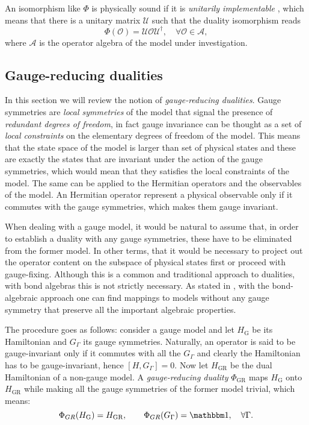 An isomorphism like $\Phi$ is physically sound if it is \emph{unitarily implementable} \cite{cobanera2011bond}, which means that there is a unitary matrix $\mathcal{U}$ such that the duality isomorphism reads
\begin{equation}
    \Phi(\mathcal{O}) =
    \mathcal{U} \mathcal{O} \mathcal{U}^{\dagger}, \quad
    \forall \mathcal{O} \in \mathcal{A},
\end{equation}
where $\mathcal{A}$ is the operator algebra of the model under investigation.

%
%
\subsection{Gauge-reducing dualities}%
\label{sub:gauge_reducing_dualities}

In this section we will review the notion of \emph{gauge-reducing dualities}.
Gauge symmetries are \emph{local symmetries} of the model that signal the presence of \emph{redundant degrees of freedom}, in fact gauge invariance can be thought as a set of \emph{local constraints} on the elementary degrees of freedom of the model.
This means that the state space of the model is larger than set of physical states and these are exactly the states that are invariant under the action of the gauge symmetries, which would mean that they satisfies the local constraints of the model.
The same can be applied to the Hermitian operators and the observables of the model.
An Hermitian operator represent a physical observable only if it commutes with the gauge symmetries, which makes them gauge invariant.

When dealing with a gauge model, it would be natural to assume that, in order to establish a duality with any gauge symmetries, these have to be eliminated from the former model.
In other terms, that it would be necessary to project out the operator content on the subspace of physical states first or proceed with gauge-fixing.
Although this is a common and traditional approach to dualities, with bond algebras this is not strictly necessary.
As stated in \cite{cobanera2011bond}, with the bond-algebraic approach one can find mappings to models without any gauge symmetry that preserve all the important algebraic properties.

The procedure goes as follows: consider a gauge model and let $H_{\text{G}}$ be its Hamiltonian and $G_{\Gamma}$ its gauge symmetries.
Naturally, an operator is said to be gauge-invariant only if it commutes with all the $G_{\Gamma}$ and
clearly the Hamiltonian has to be gauge-invariant, hence $[H, G_{\Gamma}] = 0$.
Now let $H_{\text{GR}}$ be the dual Hamiltonian of a non-gauge model.
A \emph{gauge-reducing duality} $\Phi_{\text{GR}}$ maps $H_{\text{G}}$ onto $H_{\text{GR}}$ while making all the gauge symmetries of the former model trivial, which means:
\begin{equation}
    \Phi_{GR}(H_{\text{G}}) = H_{\text{GR}}, \qquad
    \Phi_{GR}(G_{\Gamma}) = \identity, \quad \forall \Gamma.
\end{equation}

